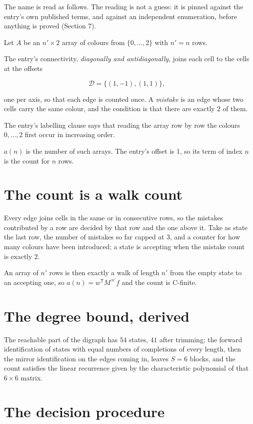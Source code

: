 \documentclass[11pt]{article}
\theoremstyle{definition}
\begin{document}
The name is read as follows. The reading is not a guess: it is pinned against the entry's own published terms, and against an independent enumeration, before anything is proved (Section 7).

Let $A$ be an $n' \times 2$ array of colours from $\{0,\dots,2\}$ with $n' = n$ rows.

The entry's connectivity, {\itshape diagonally and antidiagonally}, joins each cell to the cells at the offsets

\[\mathcal{D} = \{(1,-1), (1,1)\},\]

one per axis, so that each edge is counted once. A {\itshape mistake} is an edge whose two cells carry the same colour, and the condition is that there are exactly $2$ of them.

The entry's labelling clause says that reading the array row by row the colours $0,\dots,2$ first occur in increasing order.

$a(n)$ is the number of such arrays. The entry's offset is 1, so its term of index $n$ is the count for $n$ rows.

\section{The count is a walk count}

Every edge joins cells in the same or in consecutive rows, so the mistakes contributed by a row are decided by that row and the one above it. Take as state the last row, the number of mistakes so far capped at $3$, and a counter for how many colours have been introduced; a state is accepting when the mistake count is exactly $2$.

An array of $n'$ rows is then exactly a walk of length $n'$ from the empty state to an accepting one, so $a(n) = w^{\mathsf T}M^{\,n'}f$ and the count is C-finite.

\section{The degree bound, derived}

The reachable part of the digraph has $54$ states, $41$ after trimming; the forward identification of states with equal numbers of completions of every length, then the mirror identification on the edges coming in, leaves $S = 6$ blocks, and the count satisfies the linear recurrence given by the characteristic polynomial of that $6\times6$ matrix.

\section{The decision procedure}
\end{document}
